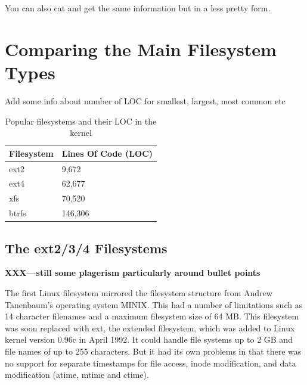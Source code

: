 \noindent
You can also cat  and get the same information but in a less pretty form.


\section{Comparing the Main Filesystem Types}


Add some info about number of LOC for smallest, largest, most common etc

\begin{table}[h]
\begin{center}
\begin{tabular}{|p{}|m{}|}
\hline
\rowcolor[gray]{.93}\bf{Filesystem}&\bf{Lines Of Code (LOC)}\\
\hline
ext2 & 9,672\\
\hline
ext4 & 62,677\\
\hline
xfs & 70,520\\
\hline
btrfs & 146,306\\
\hline
\end{tabular}
\label{table:fs-loc}
\caption{\small Popular filesystems and their LOC in the kernel}
\end{center}
\end{table}


\subsection{The ext2/3/4 Filesystems}

\textbf{XXX---still some plagerism particularly around bullet points}

The first Linux filesystem mirrored the filesystem structure from Andrew Tanenbaum's operating system MINIX. This had a number of limitations such as 14 character filenames and a maximum filesystem size of 64 MB. This filesystem was soon replaced with ext, the extended filesystem, which was added to Linux kernel version 0.96c in April 1992. It could handle file systems up to 2 GB and file names of up to 255 characters. But it had its own problems in that there was no support for separate timestamps for file access, inode modification, and data modification (atime, mtime and ctime).

